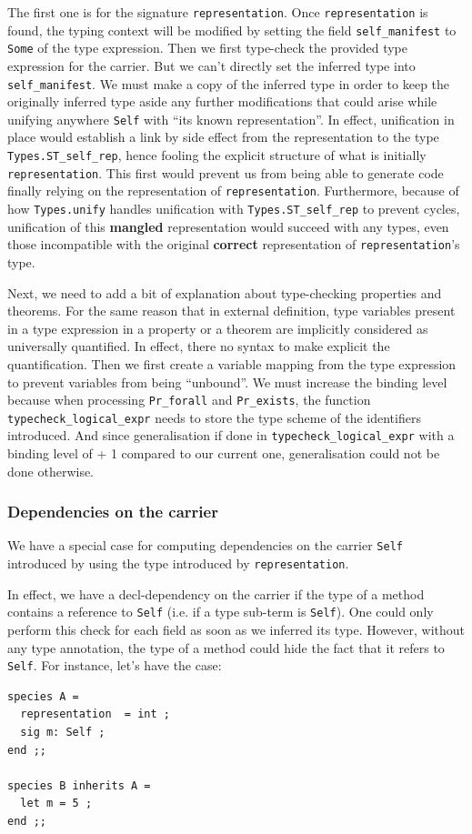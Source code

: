 The first one is for the signature {\tt representation}. Once
{\tt representation} is found, the typing context will be modified by
setting the field {\tt self\_manifest} to {\tt Some} of the type
expression. Then we first type-check the provided type expression for
the carrier. But we can't directly set the inferred type into
{\tt self\_manifest}. We must make a copy of the inferred type in order
to keep the originally inferred type aside any further modifications that
could arise while unifying anywhere {\tt Self} with ``its known
representation''. In effect, unification in place would establish a
link by side effect from the representation to the type
{\tt Types.ST\_self\_rep}, hence fooling the explicit structure of
what is initially {\tt representation}. This first would prevent us
from being able to generate code finally relying on the representation
of {\tt representation}. Furthermore, because of how {\tt Types.unify}
handles unification with {\tt Types.ST\_self\_rep} to prevent cycles,
unification of this {\bf mangled} representation would succeed with
any types, even those incompatible with the original {\bf correct}
representation of {\tt representation}'s type.

\medskip
Next, we need to add a bit of explanation about type-checking
properties and theorems. For the same reason that in external
definition, type variables present in a type expression in a property
or a theorem are implicitly considered as universally quantified. In
effect, there no syntax to make explicit the quantification. Then we
first create a variable mapping from the type expression to prevent
variables from being ``unbound''. We must increase the binding level
because when processing {\tt Pr\_forall} and {\tt Pr\_exists}, the
function {\tt typecheck\_logical\_expr} needs to store the type scheme
of the identifiers introduced. And since generalisation if done in
{\tt typecheck\_logical\_expr} with a binding level of + 1 compared to
our current one, generalisation could not be done otherwise.


\subsubsection{Dependencies on the carrier}
\label{deps-on-carrier}
We have a special case for computing dependencies on the carrier
{\tt Self} introduced by using the type introduced by
{\tt representation}. 

In effect, we have a decl-dependency on the carrier if the type of a
method contains a reference to {\tt Self} (i.e. if a type sub-term is
{\tt Self}). One could only perform this check for each field as soon
as we inferred its type. However, without any type annotation, the type
of a method could hide the fact that it refers to {\tt Self}. For
instance, let's have the case:
{\footnotesize
\begin{lstlisting}
species A =
  representation  = int ;
  sig m: Self ;
end ;;

species B inherits A =
  let m = 5 ;
end ;;
\end{lstlisting}
}


